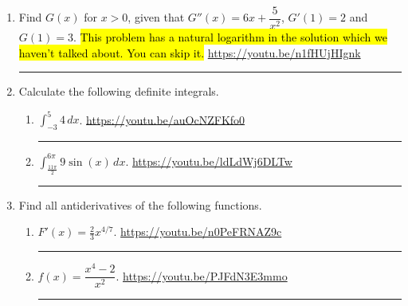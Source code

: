 \documentclass[12pt]{article}
\newcommand{\ds}{\displaystyle}
\begin{document}
\begin{enumerate}


\item Find $G(x)$ for $x > 0$, given that $G''(x) = 6x + \dfrac{5}{x^2}$, $G'(1) = 2$ and $G(1) = 3$. \hl{This problem has a natural logarithm in the solution which we haven't talked about. You can skip it.}
\vfill
\vfill
\hfill \url{https://youtu.be/n1fHUjHIgnk}
\hrule

\newpage
\item Calculate the following definite integrals.
\begin{enumerate}
\item $\ds \int_{-3}^5  4 \, dx$. 
\vfill
\hfill \url{https://youtu.be/auOcNZFKfo0}
\hrule

\item $\ds \int_{\tfrac{11\pi}{2}}^{6\pi}  9 \sin (x) \, dx$. 
\vfill
\hfill \url{https://youtu.be/ldLdWj6DLTw}
\hrule
\end{enumerate}


\item Find all antiderivatives of the following functions. 
\begin{enumerate}
\item $F'(x)= \tfrac{2}{3} x^{4/7}$. 
\vfill
\hfill \url{https://youtu.be/n0PeFRNAZ9c}
\hrule

\item $f(x) = \dfrac{x^4 - 2}{x^2}.$
\vfill
\hfill \url{https://youtu.be/PJFdN3E3mmo}
\hrule


\end{enumerate}
\end{enumerate}
\end{document}
